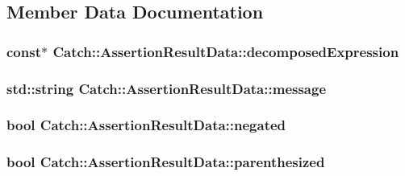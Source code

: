 \subsection{Member Data Documentation}
\hypertarget{structCatch_1_1AssertionResultData_a45b2bf2ed11da83d09dd78a2b7a44cd4}{
\subsubsection[{decomposed\-Expression}]{ const$\ast$ Catch\-::\-Assertion\-Result\-Data\-::decomposed\-Expression\hspace{0.3cm}{\ttfamily [mutable]}}}\label{structCatch_1_1AssertionResultData_a45b2bf2ed11da83d09dd78a2b7a44cd4}
\hypertarget{structCatch_1_1AssertionResultData_ac34215803c4c4a88f795879f61c1f7b4}{
\subsubsection[{message}]{\setlength{\rightskip}{0pt plus 5cm}std\-::string Catch\-::\-Assertion\-Result\-Data\-::message}}\label{structCatch_1_1AssertionResultData_ac34215803c4c4a88f795879f61c1f7b4}
\hypertarget{structCatch_1_1AssertionResultData_a17773c6f999cfded12e470b0321694a1}{
\subsubsection[{negated}]{\setlength{\rightskip}{0pt plus 5cm}bool Catch\-::\-Assertion\-Result\-Data\-::negated}}\label{structCatch_1_1AssertionResultData_a17773c6f999cfded12e470b0321694a1}
\hypertarget{structCatch_1_1AssertionResultData_a8418e3744b5486cb7f0d79c84569078e}{
\subsubsection[{parenthesized}]{\setlength{\rightskip}{0pt plus 5cm}bool Catch\-::\-Assertion\-Result\-Data\-::parenthesized}}\label{structCatch_1_1AssertionResultData_a8418e3744b5486cb7f0d79c84569078e}
